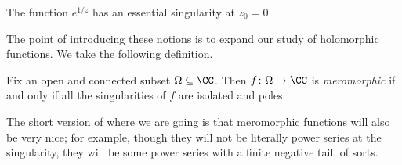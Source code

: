 \documentclass[../notes.tex]{subfiles}
\begin{document}
\begin{example}
	The function $e^{1/z}$ has an essential singularity at $z_0=0$.
\end{example}
The point of introducing these notions is to expand our study of holomorphic functions. We take the following definition.
\begin{definition}[Meromorphic]
	Fix an open and connected subset $\Omega\subseteq\CC$. Then $f\colon \Omega\to\CC$ is \textit{meromorphic} if and only if all the singularities of $f$ are isolated and poles.
\end{definition}
The short version of where we are going is that meromorphic functions will also be very nice; for example, though they will not be literally power series at the singularity, they will be some power series with a finite negative tail, of sorts.
\end{document}
